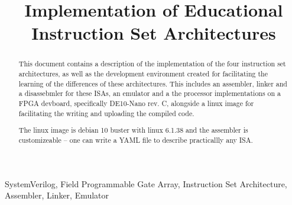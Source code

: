 \documentclass[conference]{IEEEtran}
\begin{document}
\title{Implementation of Educational Instruction Set Architectures}

\author{
	\and
	\and
	\and
}

\maketitle

\begin{abstract}
	This document contains a description of the implementation of the
	four instruction set architectures, as well as the development environment created
	for facilitating the learning of the differences of these architectures.
	This includes an assembler, linker and a disassebmler for these ISAs, an emulator
	and a the processor implementations on a FPGA devboard, specifically DE10-Nano rev. C,
	alongside a linux image for facilitating the writing and uploading the compiled code.

	The linux image is debian 10 buster with linux 6.1.38 and the assembler is
	customizeable -- one can write a YAML file to describe practicallly any ISA.
\end{abstract}

\begin{IEEEkeywords}
	SystemVerilog, Field Programmable Gate Array, Instruction Set Architecture, Assembler, Linker, Emulator
\end{IEEEkeywords}
\end{document}
